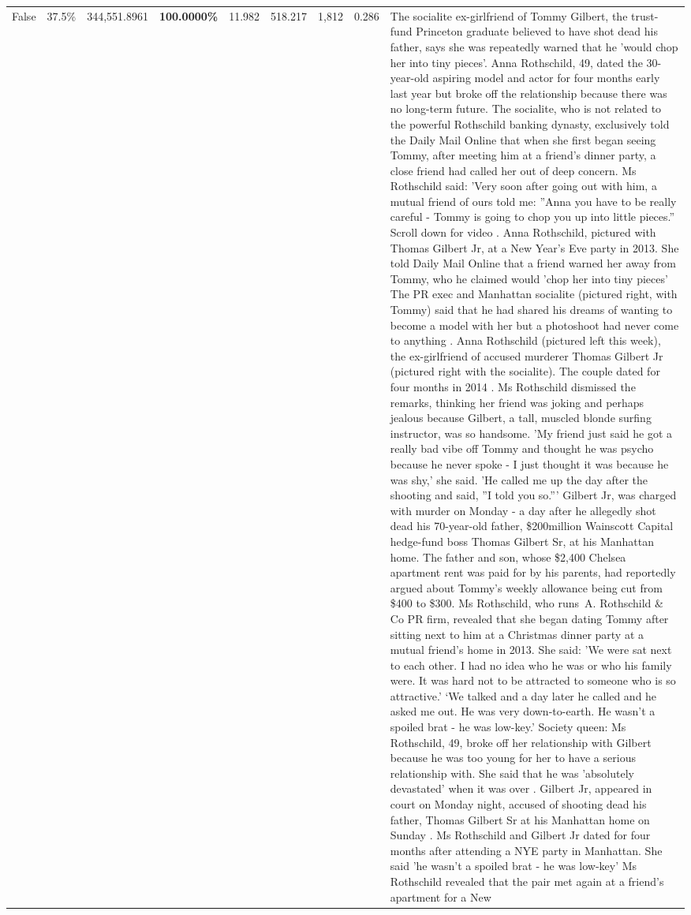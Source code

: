 \begin{table}[H]
\begin{tabular}{lllrlllll}
False & 37.5\% & 344,551.8961 & \bfseries \color{red} 100.0000\% & 11.982 & 518.217 & 1,812 & 0.286 & The socialite ex-girlfriend of Tommy Gilbert, the trust-fund Princeton graduate believed to have shot dead his father, says she was repeatedly warned that he 'would chop her into tiny pieces'. Anna Rothschild, 49, dated the 30-year-old aspiring model and actor for four months early last year but broke off the relationship because there was no long-term future. The socialite, who is not related to the powerful Rothschild banking dynasty, exclusively told the Daily Mail Online that when she first began seeing Tommy, after meeting him at a friend's dinner party, a close friend had called her out of deep concern. Ms Rothschild said: 'Very soon after going out with him, a mutual friend of ours told me: ''Anna you have to be really careful - Tommy is going to chop you up into little pieces.'' Scroll down for video . Anna Rothschild, pictured with Thomas Gilbert Jr, at a New Year's Eve party in 2013. She told Daily Mail Online that a friend warned her away from Tommy, who he claimed would 'chop her into tiny pieces' The PR exec and Manhattan socialite (pictured right, with Tommy) said that he had shared his dreams of wanting to become a model with her but a photoshoot had never come to anything . Anna Rothschild (pictured left this week), the ex-girlfriend of accused murderer Thomas Gilbert Jr (pictured right with the socialite). The couple dated for four months in 2014 . Ms Rothschild dismissed the remarks, thinking her friend was joking and perhaps jealous because Gilbert, a tall, muscled blonde surfing instructor, was so handsome. 'My friend just said he got a really bad vibe off Tommy and thought he was psycho because he never spoke - I just thought it was because he was shy,' she said. 'He called me up the day after the shooting and said, ''I told you so.''' Gilbert Jr, was charged with murder on Monday - a day after he allegedly shot dead his 70-year-old father, \$200million Wainscott Capital hedge-fund boss Thomas Gilbert Sr, at his Manhattan home. The father and son, whose \$2,400 Chelsea apartment rent was paid for by his parents, had reportedly argued about Tommy's weekly allowance being cut from \$400 to \$300. Ms Rothschild, who runs A. Rothschild \& Co PR firm, revealed that she began dating Tommy after sitting next to him at a Christmas dinner party at a mutual friend's home in 2013. She said: 'We were sat next to each other. I had no idea who he was or who his family were. It was hard not to be attracted to someone who is so attractive.' ‘We talked and a day later he called and he asked me out. He was very down-to-earth. He wasn’t a spoiled brat - he was low-key.’ Society queen: Ms Rothschild, 49, broke off her relationship with Gilbert because he was too young for her to have a serious relationship with. She said that he was 'absolutely devastated' when it was over . Gilbert Jr, appeared in court on Monday night, accused of shooting dead his father, Thomas Gilbert Sr at his Manhattan home on Sunday . Ms Rothschild and Gilbert Jr dated for four months after attending a NYE party in Manhattan. She said 'he wasn't a spoiled brat - he was low-key' Ms Rothschild revealed that the pair met again at a friend’s apartment for a New 
\end{tabular}
\end{table}
